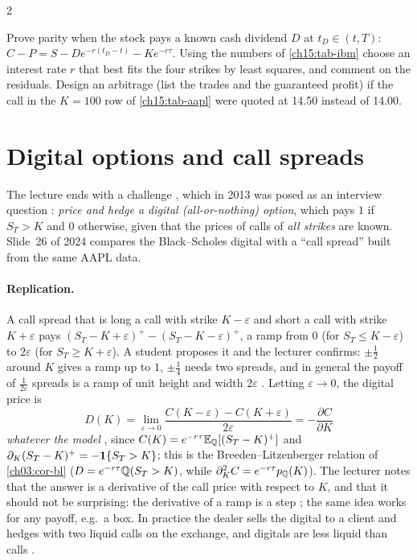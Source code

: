 \begin{paracol}{2}
\begin{exercise}\label{ch15:ex-parity}
Prove parity when the stock pays a known cash dividend $D$ at $t_D\in(t,T)$: $C-P=S-De^{-r(t_D-t)}-Ke^{-r\tau}$. Using the numbers of \cref{ch15:tab-ibm} choose an interest rate $r$ that best fits the four strikes by least squares, and comment on the residuals.
Design an arbitrage (list the trades and the guaranteed profit) if the call in the $K=100$ row of \cref{ch15:tab-aapl} were quoted at 14.50 instead of 14.00.
\end{exercise}

\section{Digital options and call spreads}\label{ch15:sec-digital}
The lecture ends with a challenge , which in 2013 was posed as an interview question : \emph{price and hedge a digital (all-or-nothing) option}, which pays $1$
if $S_T>K$ and $0$ otherwise, given that the prices of calls of \emph{all strikes} are known. Slide~26 of 2024 compares the Black--Scholes digital with a ``call spread'' built from the same
AAPL data.

\paragraph{Replication.} A call spread that is long a call with strike $K-\varepsilon$ and short a call with strike $K+\varepsilon$ pays
$(S_T-K+\varepsilon)^+-(S_T-K-\varepsilon)^+$, a ramp from $0$ (for $S_T\le K-\varepsilon$) to $2\varepsilon$ (for $S_T\ge K+\varepsilon$). A student proposes it and the lecturer confirms:
$\pm\tfrac12$ around $K$ gives a ramp up to $1$, $\pm\tfrac14$ needs two spreads, and in general the payoff of $\frac1{2\varepsilon}$ spreads is a ramp of unit height and width $2\varepsilon$
. Letting $\varepsilon\to0$, the digital price is
\begin{equation}\label{ch15:eq-digital-limit}
  D(K)=\lim_{\varepsilon\to0}\frac{C(K-\varepsilon)-C(K+\varepsilon)}{2\varepsilon}=-\frac{\partial C}{\partial K}
\end{equation}
\emph{whatever the model} , since $C(K)=e^{-r\tau}\mathbb{E}_{\mathbb{Q}}[(S_T-K)^+]$ and $\partial_K(S_T-K)^+=-\mathbf{1}\{S_T>K\}$; this is the Breeden--Litzenberger relation of \cref{ch03:cor-bl} ($D=e^{-r\tau}\mathbb{Q}(S_T>K)$, while $\partial^2_KC=e^{-r\tau}p_{\mathbb{Q}}(K)$). The lecturer notes that the answer is a
derivative of the call price with respect to $K$, and that it should not be surprising: the derivative of a ramp is a step ; the same idea works for any payoff, e.g.\ a box. In practice the dealer
sells the digital to a client and hedges with two liquid calls on the exchange, and digitals are less liquid than calls .


\end{paracol}
